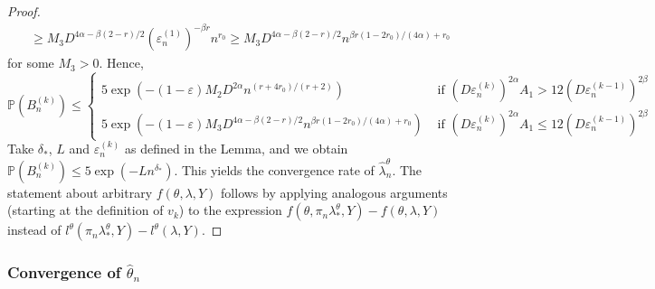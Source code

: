 \documentclass[12pt]{article}
\theoremstyle{myplain}
\theoremstyle{definition}
\theoremstyle{definition}
\theoremstyle{remark}
\numberwithin{equation}{section}
\begin{document}
\begin{proof}
\begin{equation*}
\begin{aligned}
& \geq M_{3} D^{4 \alpha-\beta(2-r) / 2}\left(\varepsilon_{n}^{(1)}\right)^{-\beta r} n^{r_0} \geq M_{3} D^{4 \alpha-\beta(2-r) / 2} n^{\beta r\left(1-2 r_0\right) /(4 \alpha)+r_0}
\end{aligned}
\end{equation*}
for some $M_{3}>0$. Hence,
\begin{equation*}
\mathbb{P}\left(B_{n}^{(k)}\right) \leq\left\{\begin{aligned}
5 \exp \left(-(1-\varepsilon) M_{2} D^{2 \alpha} n^{\left(r+4 r_0\right) /(r+2)}\right)& \text { if }\left(D \varepsilon_{n}^{(k)}\right)^{2 \alpha} A_{1}>12\left(D \varepsilon_{n}^{(k-1)}\right)^{2 \beta} \\
5 \exp \left(-(1-\varepsilon) M_{3} D^{4 \alpha-\beta(2-r) / 2} n^{\beta r\left(1-2 r_0\right) /(4 \alpha)+r_0}\right) &\text { if }\left(D \varepsilon_{n}^{(k)}\right)^{2 \alpha} A_{1} \leq 12\left(D \varepsilon_{n}^{(k-1)}\right)^{2 \beta}
\end{aligned}\right.
\end{equation*}
Take $\delta_*$, $L$ and $\varepsilon_{n}^{(k)}$ as defined in the Lemma, and we obtain $\mathbb{P}\left(B_{n}^{(k)}\right) \leq 5 \exp \left(-L {n}^{\delta_*}\right)$.
This yields the convergence rate of $\widehat{\lambda}_n^\theta$. The statement about arbitrary $f(\theta, \lambda, Y)$ follows by applying analogous arguments (starting at the definition of $v_k$) to the expression $f(\theta, \pi_n\lambda_*^\theta, Y)-f(\theta, \lambda, Y)$ instead of $l^\theta(\pi_n\lambda_*^\theta, Y)-l^\theta(\lambda, Y)$.
\end{proof}

\subsubsection{Convergence of $\widehat{\theta}_{n}$} \label{subsubsec:arates}
\end{document}
